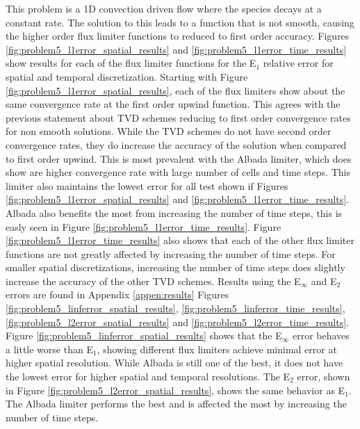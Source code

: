 This problem is a 1D convection driven flow where the species decays at a constant rate. The solution to this leads to a function that is not smooth, causing the higher order flux limiter functions to reduced to first order accuracy. Figures \ref{fig:problem5_l1error_spatial_results} and \ref{fig:problem5_l1error_time_results} show results for each of the flux limiter functions for the E${}_{1}$ relative error for spatial and temporal discretization. Starting with Figure \ref{fig:problem5_l1error_spatial_results}, each of the flux limiters show about the same convergence rate at the first order upwind function. This agrees with the previous statement about TVD schemes reducing to first order convergence rates for non smooth solutions. While the TVD schemes do not have second order convergence rates, they do increase the accuracy of the solution when compared to first order upwind. This is most prevalent with the Albada limiter, which does show are higher convergence rate with large number of cells and time steps. This limiter also maintains the lowest error for all test shown if Figures \ref{fig:problem5_l1error_spatial_results} and \ref{fig:problem5_l1error_time_results}. Albada also benefits the most from increasing the number of time steps, this is easly seen in Figure \ref{fig:problem5_l1error_time_results}. Figure \ref{fig:problem5_l1error_time_results} also shows that each of the other flux limiter functions are not greatly affected by increasing the number of time steps. For smaller spatial discretizations, increasing the number of time steps does slightly increase the accuracy of the other TVD schemes. Results using the E${}_{\infty}$ and E${}_{2}$ errors are found in Appendix \ref{appen:results} Figures \ref{fig:problem5_linferror_spatial_results}, \ref{fig:problem5_linferror_time_results}, \ref{fig:problem5_l2error_spatial_results} and \ref{fig:problem5_l2error_time_results}. Figure \ref{fig:problem5_linferror_spatial_results} shows that the E${}_{\infty}$ error behaves a little worse than E${}_{1}$, showing different flux limiters achieve minimal error at higher spatial resolution. While Albada is still one of the best, it does not have the lowest error for higher spatial and temporal resolutions. The E${}_{2}$ error, shown in Figure \ref{fig:problem5_l2error_spatial_results}, shows the same behavior as E${}_{1}$. The Albada limiter performs the best and is affected the most by increasing the number of time steps.  

